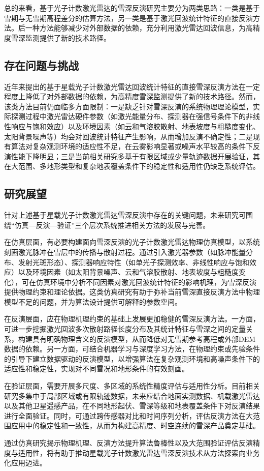总的来看，基于光子计数激光雷达的雪深反演研究主要分为两类思路：一类是基于雪期与无雪期高程差分的估算方法，另一类是基于激光回波统计特征的直接反演方法。后一种方法能够减少对外部数据的依赖，充分利用激光雷达回波信息，为高精度雪深监测提供了新的技术路径。

\subsection{存在问题与挑战}

近年来提出的基于星载光子计数激光雷达回波统计特征的直接雪深反演方法在一定程度上降低了对外部数据的依赖，为高精度雪深监测提供了新的技术路径。然而，该类方法目前仍面临多方面限制：一是缺乏针对雪深反演的系统物理理论模型，实际探测过程中激光雷达硬件参数（如激光能量分布、探测器在强信号条件下的非线性响应与饱和效应）以及环境因素（如云和气溶胶散射、地表坡度与粗糙度变化、太阳背景噪声等）均会对回波统计特征产生影响，从而增加反演不确定性；二是现有算法对复杂观测环境的适应性不足，在云雾影响显著或噪声水平较高的条件下反演性能下降明显；三是当前相关研究多基于有限区域或少量轨迹数据开展验证，其在大范围、多地形类型和复杂地表覆盖条件下的稳定性和适用性仍缺乏系统评估。

\subsection{研究展望}

针对上述基于星载光子计数激光雷达雪深反演中存在的关键问题，未来研究可围绕“仿真—反演—验证”三个层次系统推进相关方法的发展与完善。

在仿真层面，有必要构建面向雪深反演的光子计数激光雷达物理仿真模型，以系统刻画激光脉冲在雪层中的传播与散射过程。通过引入激光器参数（如脉冲能量分布、发射光斑形态）、探测器响应特性（如单光子探测效率、非线性响应与饱和效应）以及环境因素（如太阳背景噪声、云和气溶胶散射、地表坡度与粗糙度变化），可在仿真环境中分析不同因素对激光回波统计特征的影响机理，为雪深反演提供物理约束和理论依据。这类仿真研究有助于弥补当前雪深直接反演方法中物理模型不足的问题，并为算法设计提供可解释的参数空间。

在反演层面，应在物理机理约束的基础上发展更加稳健的雪深反演方法。一方面，可进一步挖掘激光回波多次散射路径长度分布及其统计特征与雪深之间的定量关系，构建具有明确物理含义的反演模型，从而降低对无雪期参考高程或外部DEM数据的依赖。另一方面，可结合机器学习与深度学习方法，在物理约束或先验条件的引导下建立数据驱动的反演模型，以增强算法在复杂观测环境和高噪声条件下的适应性和稳定性，实现对不同雪况和地形条件的有效刻画。

在验证层面，需要开展多尺度、多区域的系统性精度评估与适用性分析。目前相关研究多集中于局部区域或有限轨迹数据，未来应结合地面实测数据、机载激光雷达以及其他卫星遥感产品，在不同地形起伏、雪深等级和地表覆盖条件下对反演结果进行全面验证。同时，可通过跨传感器对比和时间序列分析，评估反演方法在大范围应用中的稳定性和一致性，从而为构建高精度、时空连续的雪深产品奠定基础。

通过仿真研究揭示物理机理、反演方法提升算法鲁棒性以及大范围验证评估反演精度与适用性，将有助于推动星载光子计数激光雷达雪深反演技术从方法探索向业务化应用迈进。

\newpage
\begingroup
    \printbibliography[title={参考文献}]
\endgroup
